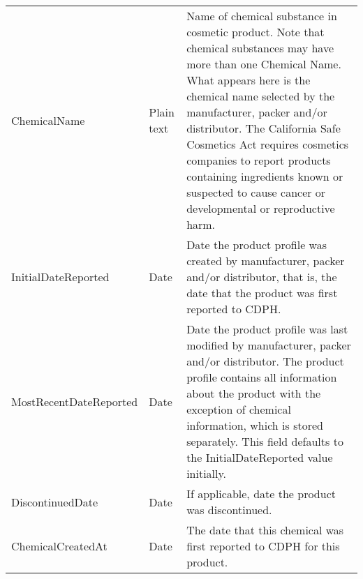 \begin{table}[]
\begin{tabular}{@{}lll@{}}
ChemicalName           & Plain text & Name of chemical substance in cosmetic product. Note that chemical substances may have more than one Chemical Name. What appears here is the chemical name selected by the manufacturer, packer and/or distributor. The California Safe Cosmetics Act  requires cosmetics companies to report products containing ingredients known or suspected to cause cancer or developmental or reproductive harm.                                                               \\
InitialDateReported    & Date       & Date the product profile was created by manufacturer, packer and/or distributor, that is, the date that the product was first reported to CDPH.                                                                                                                                                                                                                                                                                                                       \\
MostRecentDateReported & Date       & Date the product profile was last modified by manufacturer, packer and/or distributor. The product profile contains all information about the product with the exception of chemical information, which is stored separately. This field defaults to the InitialDateReported value initially.                                                                                                                                                                         \\
DiscontinuedDate       & Date       & If applicable, date the product was discontinued.                                                                                                                                                                                                                                                                                                                                                                                                                     \\
ChemicalCreatedAt      & Date       & The date that this chemical was first reported to CDPH for this product.                                                                                                                                                                                                                                                                                                                                                                                              \\

\end{tabular}
\end{table}
